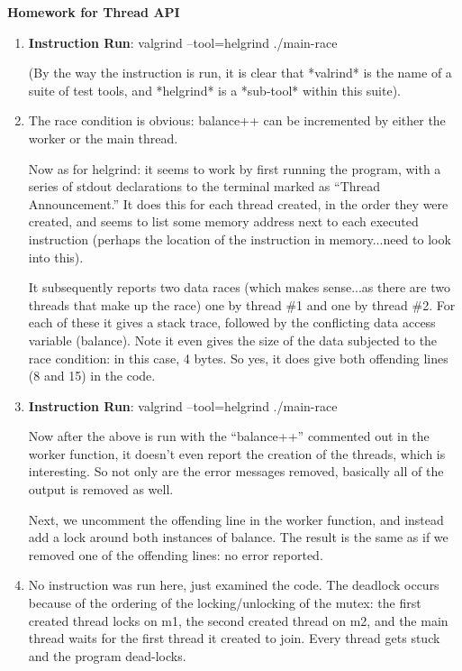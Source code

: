 \documentclass{article}
\begin{document}
\noindent \textbf{Homework for Thread API}  %


\begin{enumerate}

\item 
 
\textbf{Instruction Run}: valgrind --tool=helgrind ./main-race 

(By the way the instruction is run, it is clear that *valrind* is the name of a 
suite of test tools, and *helgrind* is a *sub-tool* within this suite). 

\item The race condition is obvious: balance++ can be incremented by either the 
worker or the main thread. 

Now as for helgrind: it seems to work by first running the program, with a series
of stdout declarations to the terminal marked as ``Thread Announcement.'' It does
this for each thread created, in the order they were created, and seems to list
some memory address next to each executed instruction (perhaps the location
of the instruction in memory...need to look into this). 

It subsequently reports two data races (which makes sense...as there are two
threads that make up the race) one by thread \#1 and one by thread \#2. For
each of these it gives a stack trace, followed by the conflicting data access
variable (balance). Note it even gives the size of the data subjected to the 
race condition: in this case, 4 bytes. So yes, it does give both offending lines
(8 and 15) in the code. 

\item 

\textbf{Instruction Run}: valgrind --tool=helgrind ./main-race 

Now after the above is run with the ``balance++'' commented out in the worker function, 
it doesn't even report the creation of the threads, which is interesting. So not only are 
the error messages removed, basically all of the output is removed as well. 

Next, we uncomment the offending line in the worker function, and instead add a lock
around both instances of balance. The result is the same as if we removed one of the 
offending lines: no error reported. 

\item 

No instruction was run here, just examined the code. The deadlock occurs because
of the ordering of the locking/unlocking of the mutex: the first created thread locks on
m1, the second created thread on m2, and the main thread waits for the first thread it created
to join. Every thread gets stuck and the program dead-locks. 



\end{enumerate}
\end{document}
